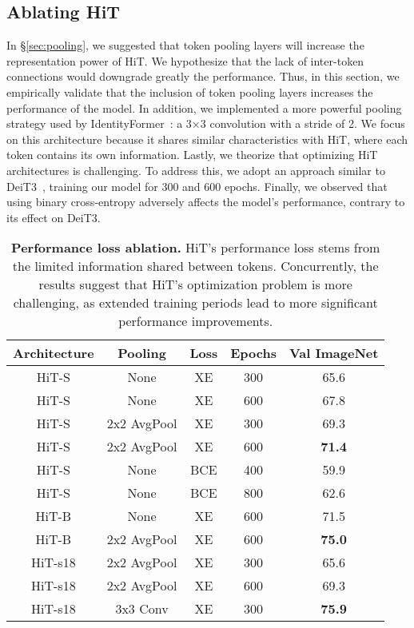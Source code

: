 \subsection{Ablating HiT}\label{sec:perf-loss}


In \S\ref{sec:pooling}, we suggested that token pooling layers will increase the representation power of HiT. 
We hypothesize that the lack of inter-token connections would downgrade greatly the performance. 
Thus, in this section, we empirically validate that the inclusion of token pooling layers increases the performance of the model. 
In addition, we implemented a more powerful pooling strategy used by IdentityFormer~\cite{yu2024metaformer}: a 3×3 convolution with a stride of 2.
We focus on this architecture because it shares similar characteristics with HiT, where each token contains its own information.
Lastly, we theorize that optimizing HiT architectures is challenging. To address this, we adopt an approach similar to DeiT3~\cite{Touvron2022DeiTIR}, training our model for 300 and 600 epochs. Finally, we observed that using binary cross-entropy adversely affects the model's performance, contrary to its effect on DeiT3.

\begin{table}[t]
    \centering
    \tiny
    \begin{tabular}{c|ccc|c} \toprule
       \textbf{Architecture} & \textbf{Pooling}     & \textbf{Loss} & \textbf{Epochs} & \textbf{Val ImageNet}\\ \midrule
       HiT-S        & None        & XE   & 300    & 65.6 \\
       HiT-S        & None        & XE   & 600    & 67.8 \\
       HiT-S        & 2x2 AvgPool & XE   & 300    & 69.3 \\
       HiT-S        & 2x2 AvgPool & XE   & 600    & \textbf{71.4} \\
       HiT-S        & None        & BCE  & 400    & 59.9 \\
       HiT-S        & None        & BCE  & 800    & 62.6 \\ \midrule
       HiT-B        & None        & XE   & 600    & 71.5 \\
       HiT-B        & 2x2 AvgPool & XE   & 600    & \textbf{75.0} \\ \midrule
       HiT-s18      & 2x2 AvgPool & XE   & 300    & 65.6 \\
       HiT-s18      & 2x2 AvgPool & XE   & 600    & 69.3 \\
       HiT-s18      & 3x3 Conv    & XE   & 300    & \textbf{75.9} \\ 
       \bottomrule
    \end{tabular}
    \caption{\textbf{Performance loss ablation.} HiT's performance loss stems from the limited information shared between tokens. Concurrently, the results suggest that HiT's optimization problem is more challenging, as extended training periods lead to more significant performance improvements.}
    \label{tab:perf_loss}
    \vspace{-3mm}
\end{table}

